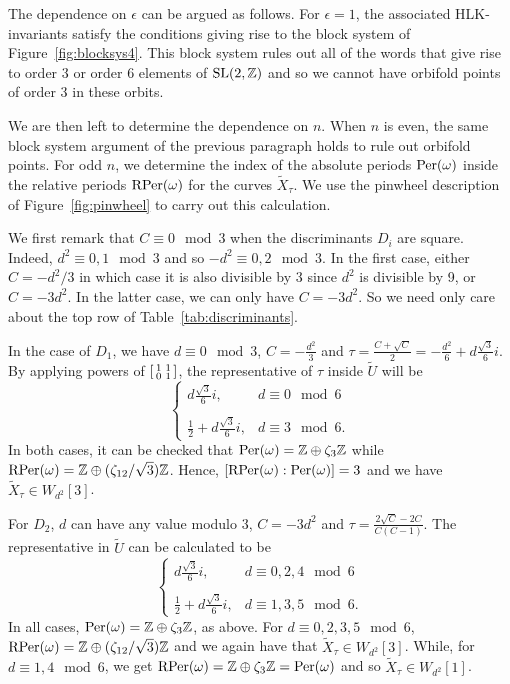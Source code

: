 \documentclass[a4paper,11pt]{amsart}
\numberwithin{equation}{section}
\numberwithin{figure}{section}
\numberwithin{table}{section}
\newcommand{\Z}{\mathbb{Z}}
\DeclareMathOperator{\SL}{{\rm{SL}}}
\begin{document}
The dependence on $\epsilon$ can be argued as follows. For $\epsilon = 1$, the associated HLK-invariants satisfy the conditions giving rise to the block system of Figure~\ref{fig:blocksys4}. This block system rules out all of the words that give rise to order 3 or order 6 elements of $\SL(2,\Z)$ and so we cannot have orbifold points of order 3 in these orbits.

We are then left to determine the dependence on $n$. When $n$ is even, the same block system argument of the previous paragraph holds to rule out orbifold points. For odd $n$, we determine the index of the absolute periods ${\rm Per}(\omega)$ inside the relative periods ${\rm RPer}(\omega)$ for the curves $\widetilde{X}_{\tau}$. We use the pinwheel description of Figure~\ref{fig:pinwheel} to carry out this calculation.

We first remark that $C\equiv 0\!\!\mod 3$ when the discriminants $D_i$ are square. Indeed, $d^2\equiv0,1\!\!\mod 3$ and so $-d^2\equiv0,2\!\!\mod 3$. In the first case, either $C = -d^2/3$ in which case it is also divisible by $3$ since $d^2$ is divisible by 9, or $C = -3d^2$. In the latter case, we can only have $C = -3d^2$. So we need only care about the top row of Table~\ref{tab:discriminants}.

In the case of $D_{1}$, we have $d\equiv 0\!\!\mod 3$, $C = -\frac{d^2}{3}$ and $\tau = \frac{C+\sqrt{C}}{2} = -\frac{d^2}{6}+d\frac{\sqrt{3}}{6}i$. By applying powers of $\begin{bsmallmatrix}1 & 1 \\ 0 & 1\end{bsmallmatrix}$, the representative of $\tau$ inside $\widetilde{U}$ will be
\[\left\lbrace\begin{array}{cc}
    d\frac{\sqrt{3}}{6}i, & d\equiv0\!\!\mod 6 \\
    \\
    \frac{1}{2}+d\frac{\sqrt{3}}{6}i, & d\equiv3\!\!\mod 6. 
\end{array}\right.\]
In both cases, it can be checked that ${\rm Per}(\omega) = \Z\oplus\zeta_{3}\Z$ while ${\rm RPer}(\omega) = \Z\oplus(\zeta_{12}/\sqrt{3})\Z$. Hence, $[{\rm RPer}(\omega):{\rm Per}(\omega)] = 3$ and we have $\widetilde{X}_{\tau}\in W_{d^2}[3]$.

For $D_2$, $d$ can have any value modulo 3, $C = -3d^2$ and $\tau = \frac{2\sqrt{C}-2C}{C(C-1)}$. The representative in $\widetilde{U}$ can be calculated to be
\[\left\lbrace\begin{array}{cc}
    d\frac{\sqrt{3}}{6}i, & d\equiv0,2,4\!\!\mod 6 \\
    \\
    \frac{1}{2}+d\frac{\sqrt{3}}{6}i, & d\equiv1,3,5\!\!\mod 6. 
\end{array}\right.\]
In all cases, ${\rm Per}(\omega) = \Z\oplus\zeta_{3}\Z$, as above. For $d\equiv0,2,3,5\!\!\mod 6$, ${\rm RPer}(\omega) = \Z\oplus(\zeta_{12}/\sqrt{3})\Z$ and we again have that $\widetilde{X}_{\tau}\in W_{d^2}[3]$. While, for $d\equiv1,4\!\!\mod 6$, we get ${\rm RPer}(\omega) =  \Z\oplus\zeta_{3}\Z = {\rm Per}(\omega)$ and so $\widetilde{X}_{\tau}\in W_{d^2}[1]$.
\end{document}
